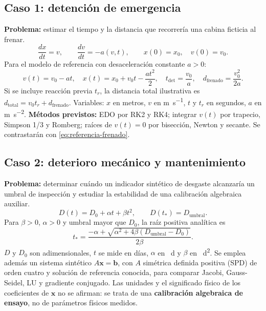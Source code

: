 \documentclass[letterpaper,11pt]{article}
\begin{document}
\subsection{Caso 1: detención de emergencia}
\textbf{Problema:} estimar el tiempo y la distancia que recorrería una cabina ficticia al frenar.
\begin{equation}\label{eq:frenado}
\frac{dx}{dt}=v,\qquad \frac{dv}{dt}=-a(v,t),\qquad x(0)=x_0,\quad v(0)=v_0.
\end{equation}
Para el modelo de referencia con desaceleración constante $a>0$:
\begin{equation}\label{eq:referencia-frenado}
v(t)=v_0-at,\quad x(t)=x_0+v_0t-\frac{at^2}{2},\quad t_\mathrm{det}=\frac{v_0}{a},\quad d_\mathrm{frenado}=\frac{v_0^2}{2a}.
\end{equation}
Si se incluye reacción previa $t_r$, la distancia total ilustrativa es $d_\mathrm{total}=v_0t_r+d_\mathrm{frenado}$. Variables: $x$ en metros, $v$ en \si{\meter\per\second}, $t$ y $t_r$ en segundos, $a$ en \si{\meter\per\second\squared}.
\textbf{Métodos previstos:} EDO por RK2 y RK4; integrar $v(t)$ por trapecio, Simpson 1/3 y Romberg; raíces de $v(t)=0$ por bisección, Newton y secante. Se contrastarán con \eqref{eq:referencia-frenado}.

\subsection{Caso 2: deterioro mecánico y mantenimiento}
\textbf{Problema:} determinar cuándo un indicador sintético de desgaste alcanzaría un umbral de inspección y estudiar la estabilidad de una calibración algebraica auxiliar.
\begin{equation}\label{eq:deterioro}
D(t)=D_0+\alpha t+\beta t^2,\qquad D(t_*)=D_{\mathrm{umbral}}.
\end{equation}
Para $\beta>0$, $\alpha>0$ y umbral mayor que $D_0$, la raíz positiva analítica es
\begin{equation}\label{eq:umbral}
t_*=\frac{-\alpha+\sqrt{\alpha^2+4\beta(D_{\mathrm{umbral}}-D_0)}}{2\beta}.
\end{equation}
$D$ y $D_0$ son adimensionales, $t$ se mide en días, $\alpha$ en \si{\per\day} y $\beta$ en \si{\per\day\squared}. Se emplea además un sistema sintético $A\boldsymbol{x}=\boldsymbol{b}$, con $A$ simétrica definida positiva (SPD) de orden cuatro y solución de referencia conocida, para comparar Jacobi, Gauss-Seidel, LU y gradiente conjugado. Las unidades y el significado físico de los coeficientes de $\boldsymbol{x}$ no se afirman: se trata de una \textbf{calibración algebraica de ensayo}, no de parámetros físicos medidos.
\end{document}
